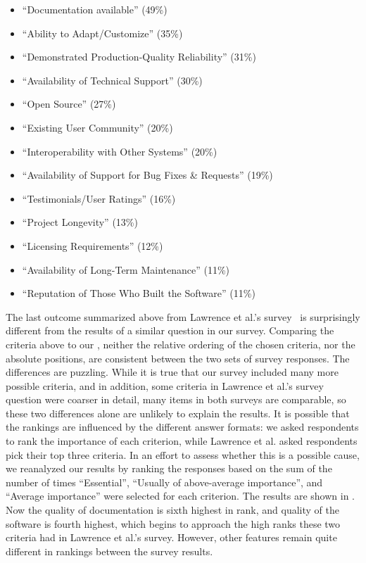 \documentclass{casicswhitepaper}
\begin{document}
\begin{itemize}
\begin{itemize}[itemsep=0ex]
\item ``Documentation available'' (49\%)
\item ``Ability to Adapt/Customize'' (35\%)
\item ``Demonstrated Production-Quality Reliability'' (31\%)
\item ``Availability of Technical Support'' (30\%)
\item ``Open Source'' (27\%)
\item ``Existing User Community'' (20\%)
\item ``Interoperability with Other Systems'' (20\%)
\item ``Availability of Support for Bug Fixes \& Requests'' (19\%)
\item ``Testimonials/User Ratings'' (16\%)
\item ``Project Longevity'' (13\%)
\item ``Licensing Requirements'' (12\%)
\item ``Availability of Long-Term Maintenance'' (11\%)
\item ``Reputation of Those Who Built the Software'' (11\%)
\end{itemize}

\end{itemize}

The last outcome summarized above from Lawrence et al.'s survey~\cite{lawrence2015science} is surprisingly different from the results of a similar question in our survey.  Comparing the criteria above to our , neither the relative ordering of the chosen criteria, nor the absolute positions, are consistent between the two sets of survey responses.  The differences are puzzling.  While it is true that our survey included many more possible criteria, and in addition, some criteria in Lawrence et al.'s survey question were coarser in detail, many items in both surveys are comparable, so these two differences alone are unlikely to explain the results.  It is possible that the rankings are influenced by the different answer formats: we asked respondents to rank the importance of each criterion, while Lawrence et al. asked respondents pick their top three criteria.  In an effort to assess whether this is a possible cause, we reanalyzed our results by ranking the responses based on the sum of the number of times ``Essential'', ``Usually of above-average importance'', and ``Average importance'' were selected for each criterion.  The results are shown in .  Now the quality of documentation is sixth highest in rank, and quality of the software is fourth highest, which begins to approach the high ranks these two criteria had in Lawrence et al.'s survey.  However, other features remain quite different in rankings between the survey results.
\end{document}
